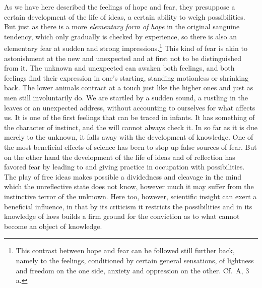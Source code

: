 \documentclass[12pt,a4paper]{book}
\newcommand{\opage}[1]{\marginnote{\footnotesize\textit{[#1]}}}
\begin{document}
As we have here described the feelings of hope and fear, they
presuppose a certain development of the life of ideas, a certain ability
to weigh possibilities. But just as there is a more \emph{elementary
form of hope} in the original sanguine tendency, which only gradually is
checked by experience, so there is also an elementary fear at sudden and
strong impressions.\footnote{This contrast between hope and fear can be
followed still further back, namely to the feelings, conditioned by
certain general sensations, of lightness and freedom on the one side,
anxiety and oppression on the other. Cf.\ A, 3 a.} This kind of fear is
akin to astonishment at the new and unexpected and at first not to be
distinguished from it. The unknown and unexpected can awaken both
feelings, and both feelings find their expression in one's starting,
standing motionless or shrinking back. The lower animals contract at a
touch just like the higher ones and just as men still involuntarily do.
We are startled by a sudden sound, a rustling in the leaves or an
unexpected address, without accounting to ourselves for what affects
us. It is one of the first feelings that can be traced in infants. It
has something of the character of instinct, and the will cannot always
check it. In so far as it is due merely to the unknown, it falls away
with the development of knowledge. One of the most beneficial effects of
science has been to stop up false sources of fear. But on the other
hand the development of the life of ideas and of reflection has
\opage{287}favored fear by leading to and giving practice in occupation
with possibilities. The play of free ideas makes possible a dividedness
and cleavage in the mind which the unreflective state does not know,
however much it may suffer from the instinctive terror of the unknown.
Here too, however, scientific insight can exert a beneficial influence,
in that by its criticism it restricts the possibilities and in its
knowledge of laws builds a firm ground for the conviction as to what
cannot become an object of knowledge.
\end{document}
